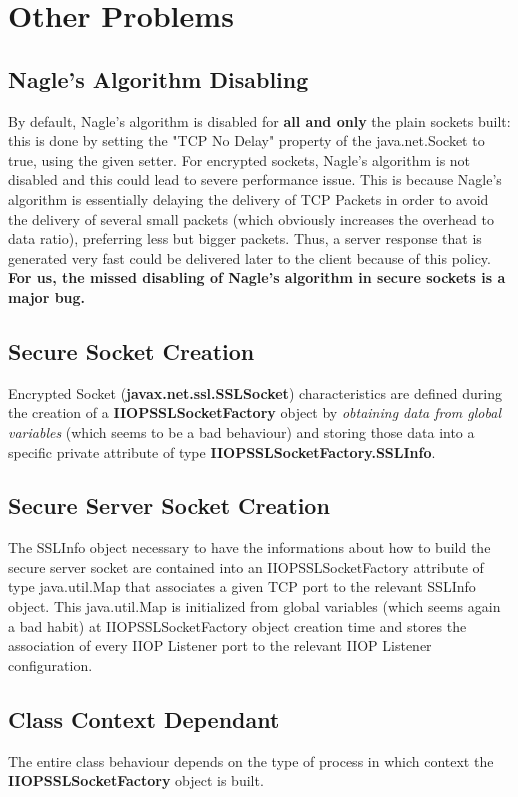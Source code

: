 \section{Other Problems}
\subsection{Nagle's Algorithm Disabling}
By default, Nagle's algorithm is disabled for \textbf{all and only} the plain sockets built: this is done by setting the "TCP No Delay" property of the java.net.Socket to true, using the given setter.
For encrypted sockets, Nagle's algorithm is not disabled and this could lead to severe performance issue.
This is because Nagle's algorithm is essentially delaying the delivery of TCP Packets in order to avoid the delivery of several small packets (which obviously increases the overhead to data ratio), preferring less but bigger packets.
Thus, a server response that is generated very fast could be delivered later to the client because of this policy.
\textbf{For us, the missed disabling of Nagle's algorithm in secure sockets is a major bug.}
\subsection{Secure Socket Creation}
Encrypted Socket (\textbf{javax.net.ssl.SSLSocket}) characteristics are defined during the creation of a \textbf{IIOPSSLSocketFactory} object by \textit{obtaining data from global variables} (which seems to be a bad behaviour) and storing those data into a specific private attribute of type \textbf{IIOPSSLSocketFactory.SSLInfo}.
\subsection{Secure Server Socket Creation}
The SSLInfo object necessary to have the informations about how to build the secure server socket are contained into an IIOPSSLSocketFactory attribute of type java.util.Map that associates a given TCP port to the relevant SSLInfo object.
This java.util.Map is initialized from global variables (which seems again a bad habit) at IIOPSSLSocketFactory object creation time and stores the association of every IIOP Listener port to the relevant IIOP Listener configuration.
\subsection{Class Context Dependant}
The entire class behaviour depends on the type of process in which context the \textbf{IIOPSSLSocketFactory} object is built.